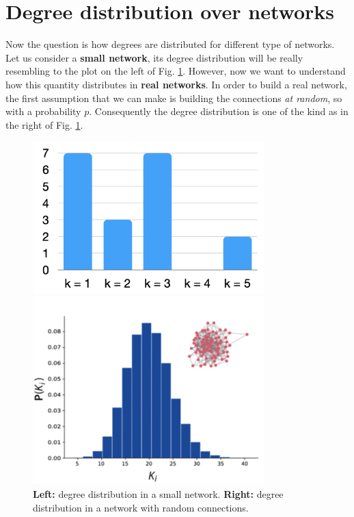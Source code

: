 \documentclass[../main/main.tex]{subfiles}
\begin{document}
\section{Degree distribution over networks}
Now the question is how degrees are distributed for different type of networks.
Let us consider a \textbf{small network}, its degree distribution will be really resembling to the plot on the left of Fig. \ref{fig:06_2}. However, now we want to understand how this quantity distributes in \textbf{real networks}. In order to build a real network, the first assumption that we can make is building the connections \textit{at random}, so with a probability $p$. Consequently the degree distribution is one of the kind as in the right of Fig. \ref{fig:06_2}.

\begin{figure}[h!]
\begin{minipage}[c]{0.5\linewidth}
\centering
\includegraphics[width=0.8\textwidth]{../lessons/image/06/2.png}
\end{minipage}
\begin{minipage}[]{0.5\linewidth}
\centering
\includegraphics[width=0.8\textwidth]{../lessons/image/06/3.png}
\end{minipage}
\caption{\label{fig:06_2} \textbf{Left:} degree distribution in a small network. \textbf{Right:} degree distribution in a network with random connections. }
\end{figure}
\end{document}
